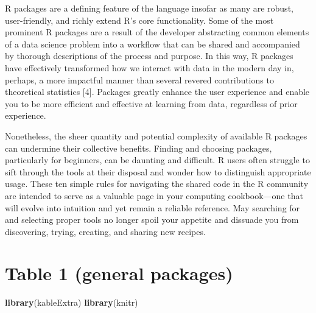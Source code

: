 \documentclass[10pt,letterpaper]{article}
\newenvironment{Shaded}{\begin{snugshade}}{\end{snugshade}}
\newcommand{\KeywordTok}[1]{\textcolor[rgb]{0.13,0.29,0.53}{\textbf{#1}}}
\newcommand{\NormalTok}[1]{#1}
\begin{document}
R packages are a defining feature of the language insofar as many are
robust, user-friendly, and richly extend R's core functionality. Some of
the most prominent R packages are a result of the developer abstracting
common elements of a data science problem into a workflow that can be
shared and accompanied by thorough descriptions of the process and
purpose. In this way, R packages have effectively transformed how we
interact with data in the modern day in, perhaps, a more impactful
manner than several revered contributions to theoretical statistics
{[}4{]}. Packages greatly enhance the user experience and enable you to
be more efficient and effective at learning from data, regardless of
prior experience.

Nonetheless, the sheer quantity and potential complexity of available R
packages can undermine their collective benefits. Finding and choosing
packages, particularly for beginners, can be daunting and difficult. R
users often struggle to sift through the tools at their disposal and
wonder how to distinguish appropriate usage. These ten simple rules for
navigating the shared code in the R community are intended to serve as a
valuable page in your computing cookbook---one that will evolve into
intuition and yet remain a reliable reference. May searching for and
selecting proper tools no longer spoil your appetite and dissuade you
from discovering, trying, creating, and sharing new recipes.

\hypertarget{table-1-general-packages}{%
\section{Table 1 (general packages)}\label{table-1-general-packages}}

\begin{Shaded}
\begin{Highlighting}[]
\KeywordTok{library}\NormalTok{(kableExtra)}
\KeywordTok{library}\NormalTok{(knitr)}
\end{Highlighting}
\end{Shaded}
\end{document}
